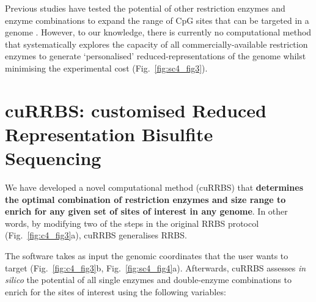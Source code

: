 \bigskip

Previous studies have tested the potential of other restriction enzymes and enzyme combinations to expand the range of CpG sites that can be targeted in a genome \citep{Cedar1979,Bystrykh2013,Martinez-Arguelles2014,Yu2004,Tanas2017,Lee2014,Wang2013,Kirschner2016}. However, to our knowledge, there is currently no computational method that systematically explores the capacity of all commercially-available restriction enzymes to generate `personalised' reduced-representations of the genome whilst minimising the experimental cost (Fig.~\ref{fig:sc4_fig3}).

\smallskip

\section{cuRRBS: customised Reduced Representation Bisulfite Sequencing}

\smallskip

We have developed a novel computational method (cuRRBS) that \textbf{determines the optimal combination of restriction enzymes and size range to enrich for any given set of sites of interest in any genome}. In other words, by modifying two of the steps in the original RRBS protocol (Fig.~\ref{fig:c4_fig3}a), cuRRBS generalises RRBS.

\bigskip

The software takes as input the genomic coordinates that the user wants to target (Fig.~\ref{fig:c4_fig3}b, Fig.~\ref{fig:sc4_fig4}a). Afterwards, cuRRBS assesses \textit{in silico} the potential of all single enzymes and double-enzyme combinations to enrich for the sites of interest using the following variables:

